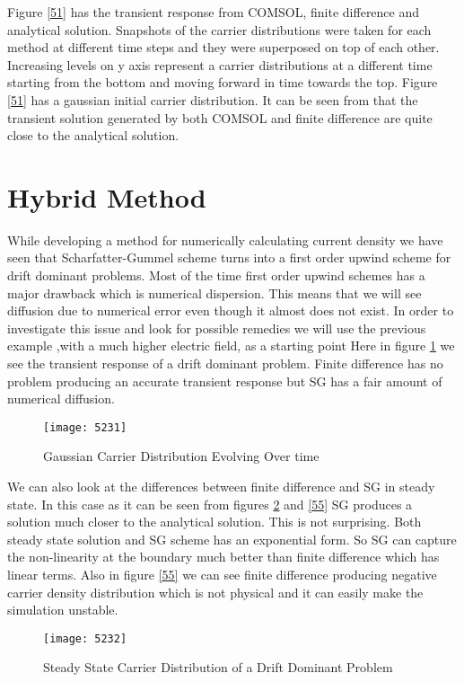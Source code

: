Figure \ref{51} has the transient response from COMSOL, finite difference and analytical solution. Snapshots of the carrier distributions were taken for each method at different time steps and they were superposed on top of each other. Increasing levels on y axis represent a carrier distributions at a different time starting from the bottom and moving forward in time towards the top. Figure \ref{51} has a gaussian initial carrier distribution. It can be seen from that the transient solution generated by both COMSOL and finite difference are quite close to the analytical solution.

\clearpage
\section{Hybrid Method}

While developing a method for numerically calculating current density we have seen that Scharfatter-Gummel scheme turns into a first order upwind scheme for drift dominant problems. Most of the time first order upwind schemes has a major drawback which is numerical dispersion. This means that we will see diffusion due to numerical error even though it almost does not exist. In order to investigate this issue and look for possible remedies we will use the previous example ,with a much higher electric field, as a starting point  Here in figure \ref{53} we see the transient response of a drift dominant problem. Finite difference has no problem producing an accurate transient response but SG has a fair amount of numerical diffusion.  

\begin{figure}[ht]
\centering
\texttt{[image: 5231]}
\caption{Gaussian Carrier Distribution Evolving Over time} 
\label{53}
\end{figure}

We can also look at the differences between finite difference and SG in steady state. In this case as it can be seen from figures \ref{54} and \ref{55} SG produces a solution much closer to the analytical solution. This is not surprising. Both steady state solution and SG scheme has an exponential form. So SG can capture the non-linearity at the boundary much better than finite difference which has linear terms. Also in figure \ref{55} we can see finite difference producing negative carrier density distribution which is not physical and it can easily make the simulation unstable.  


\begin{figure}[!htp]
\centering
\texttt{[image: 5232]}
\caption{Steady State Carrier Distribution of a Drift Dominant Problem} 
\label{54}
\end{figure}

